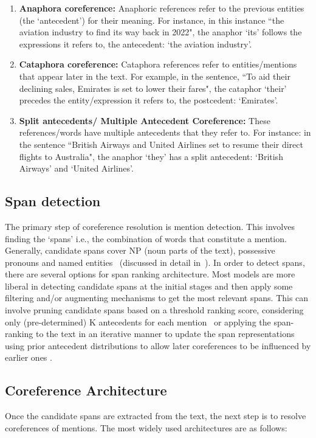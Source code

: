 \begin{enumerate}
    \item \textbf{Anaphora coreference: }
    Anaphoric references refer to the previous entities (the `antecedent') for their meaning. For instance, in this instance ``the aviation industry to find its way back in 2022", the anaphor `its' follows the expressions it refers to, the antecedent: `the aviation industry'. 
    
    \item \textbf{Cataphora coreference:}
    Cataphora references refer to entities/mentions that appear later in the text. For example, in the sentence, ``To aid their declining sales, Emirates is set to lower their fares", the cataphor `their' precedes the entity/expression it refers to, the postcedent: `Emirates'. 
    
    \item \textbf{Split antecedents/ Multiple Antecedent Coreference:}
    These references/words have multiple antecedents that they refer to. For instance: in the sentence ``British Airways and United Airlines set to resume their direct flights to Australia", the anaphor `they' has a split antecedent: `British Airways' and `United Airlines'. 
\end{enumerate}

\subsection{Span detection}

The primary step of coreference resolution is mention detection. This involves finding the `spans' i.e., the combination of words that constitute a mention. Generally, candidate spans cover NP (noun parts of the text), possessive pronouns and named entities~\cite{stanfordcoref} (discussed in detail in~). In order to detect spans, there are several options for span ranking architecture. Most models are more liberal in detecting candidate spans at the initial stages and then apply some filtering and/or augmenting mechanisms to get the most relevant spans. This can involve pruning candidate spans based on a threshold ranking score, considering only (pre-determined) K antecedents for each mention~\cite{lee2018coursetofine} or applying the span-ranking to the text in an iterative manner to update the span representations using prior antecedent distributions to allow later coreferences to be influenced by earlier ones \cite{lee2018coursetofine}. 


\subsection{Coreference Architecture}
Once the candidate spans are extracted from the text, the next step is to resolve coreferences of mentions. The most widely used architectures are as follows: 

